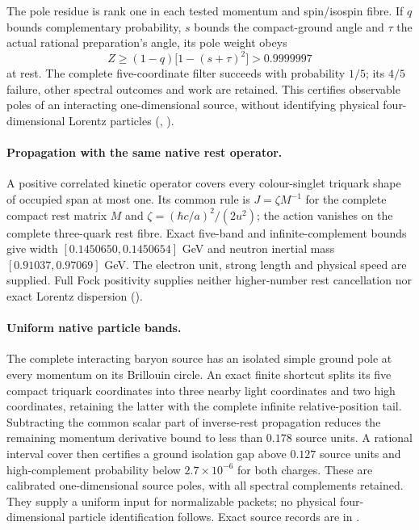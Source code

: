 The pole residue is rank one in each tested momentum and spin/isospin
fibre. If $q$ bounds complementary probability, $s$ bounds the compact-ground
angle and $\tau$ the actual rational preparation's angle, its pole weight
obeys
\[
 Z\ge(1-q)\bigl[1-(s+\tau)^2\bigr]>0.9999997
\]
at rest. The complete five-coordinate filter succeeds with probability
$1/5$; its $4/5$ failure, other spectral outcomes and work are retained.
This certifies observable poles of an interacting one-dimensional source,
without identifying physical four-dimensional Lorentz particles
(,
).

\paragraph{Propagation with the same native rest operator.}
A positive correlated kinetic operator covers every colour-singlet
triquark shape of occupied span at most one. Its common rule is
$J=\zeta M^{-1}$ for the complete compact rest matrix $M$ and
$\zeta=(\hbar c/a)^2/(2u^2)$; the action vanishes on the complete
three-quark rest fibre. Exact five-band and infinite-complement bounds
give width $[0.1450650,0.1450654]$ GeV and neutron inertial mass
$[0.91037,0.97069]$ GeV. The electron unit, strong length and physical
speed are supplied. Full Fock positivity supplies neither higher-number
rest cancellation nor exact Lorentz dispersion
().

\paragraph{Uniform native particle bands.}
The complete interacting baryon source has an isolated simple ground pole
at every momentum on its Brillouin circle. An exact finite shortcut splits
its five compact triquark coordinates into three nearby light coordinates
and two high coordinates, retaining the latter with the complete infinite
relative-position tail. Subtracting the common scalar part of inverse-rest
propagation reduces the remaining momentum derivative bound to less than
$0.178$ source units. A rational interval cover then certifies a ground
isolation gap above $0.127$ source units and high-complement probability
below $2.7\times10^{-6}$ for both charges. These are calibrated
one-dimensional source poles, with all spectral complements retained.
They supply a uniform input for normalizable packets; no physical
four-dimensional particle identification follows. Exact source records
are in .

